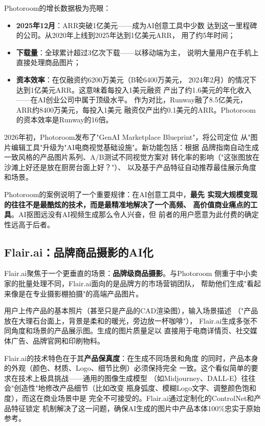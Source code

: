 Photoroom的增长数据极为亮眼：
\begin{itemize}
  \item \textbf{2025年12月}：ARR突破1亿美元——成为AI创意工具中少数
    达到这一里程碑的公司。从2020年上线到2025年达到1亿美元ARR，
    用了约5年时间；
  \item \textbf{下载量}：全球累计超过3亿次下载——以移动端为主，
    说明大量用户在手机上直接处理商品图片；
  \item \textbf{资本效率}：在仅融资约6200万美元（B轮6400万美元，
    2024年2月）的情况下达到1亿美元ARR。这意味着每投入1美元融资
    产出了约1.6美元的年化收入——在AI创业公司中属于顶级水平。
    作为对比，Runway融了8.5亿美元，ARR约8400万美元，每投入1美元
    融资仅产出约0.1美元的ARR。Photoroom的资本效率是Runway的16倍。
\end{itemize}

2026年初，Photoroom发布了"GenAI Marketplace Blueprint"，将公司定位
从"图片编辑工具"升级为"AI电商视觉基础设施"。新功能包括：根据
品牌指南自动生成一致风格的产品图片系列、A/B测试不同视觉方案对
转化率的影响（"这张图放在沙滩上好还是放在厨房台面上好？"）、
以及基于产品特征自动推荐最佳展示角度和场景。

Photoroom的案例说明了一个重要规律：在AI创意工具中，\textbf{最先
实现大规模变现的往往不是最酷炫的技术，而是最精准地解决了一个高频、
高价值商业痛点的工具}。AI抠图远没有AI视频生成那么令人兴奋，但
前者的用户愿意为此付费的确定性远高于后者。

\subsection{Flair.ai：品牌商品摄影的AI化}
\label{subsec:flairai}

Flair.ai聚焦于一个更垂直的场景：\textbf{品牌级商品摄影}。与Photoroom
侧重于中小卖家的批量处理不同，Flair.ai面向的是品牌方的市场营销团队，
帮助他们生成"看起来像是在专业摄影棚拍摄"的高端产品图片。

用户上传产品的基本照片（甚至只是产品的CAD渲染图），输入场景描述
（"产品放在大理石台面上，背景是柔和的暖光，旁边放一杯咖啡"），
Flair.ai生成多张不同角度和场景的产品展示图。生成的图片质量足以
直接用于电商详情页、社交媒体广告、品牌官网和印刷物料。

Flair.ai的技术特色在于其\textbf{产品保真度}：在生成不同场景和角度
的同时，产品本身的外观（颜色、材质、Logo、细节比例）必须保持完全
一致。这个看似简单的要求在技术上极具挑战——通用的图像生成模型
（如Midjourney、DALL-E）往往会"创造性"地修改产品细节（比如改变
瓶身弧度、模糊Logo文字、调整颜色饱和度），而这在商业场景中是
完全不可接受的。Flair.ai通过定制化的ControlNet和产品特征锁定
机制解决了这一问题，确保AI生成的图片中产品本体100\%忠实于原始参考。

